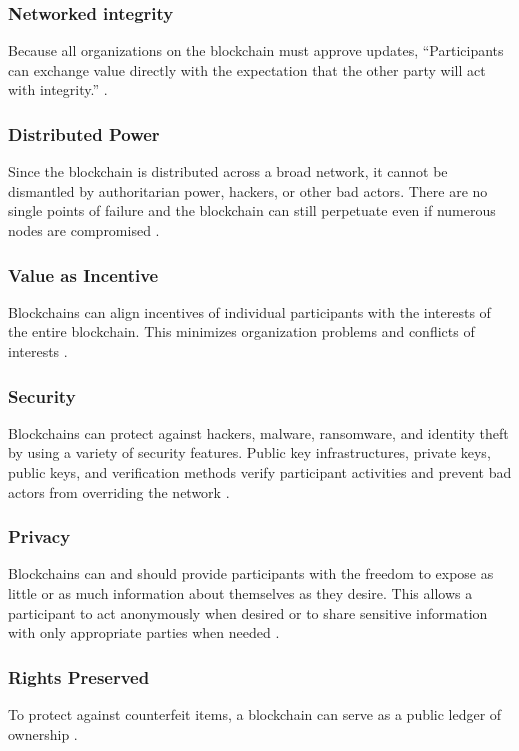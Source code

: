 \documentclass[sigconf]{acmart}
\begin{document}
\subsubsection{Networked integrity} Because all organizations on the block\-chain must approve updates, ``Participants can exchange value directly with the expectation that the other party will act with integrity.'' \cite{tapscott}. 

\subsubsection{Distributed Power} Since the blockchain is distributed across a broad network, it cannot be dismantled by authoritarian power, hackers, or other bad actors. There are no single points of failure and the blockchain can still perpetuate even if numerous nodes are compromised \cite{tapscott}.

\subsubsection{Value as Incentive} Blockchains can align incentives of individual participants with the interests of the entire blockchain. This minimizes organization problems and conflicts of interests \cite{tapscott}.

\subsubsection{Security} Blockchains can protect against hackers, malware, ransomware, and identity theft by using a variety of security features. Public key infrastructures, private keys, public keys, and verification methods verify participant activities and prevent bad actors from overriding the network \cite{tapscott}. 

\subsubsection{Privacy} Blockchains can and should provide participants with the freedom to expose as little or as much information about themselves as they desire. This allows a participant to act anonymously when desired or to share sensitive information with only appropriate parties when needed \cite{tapscott}.

\subsubsection{Rights Preserved} To protect against counterfeit items, a blockchain can serve as a public ledger of ownership \cite{tapscott}.
\end{document}
